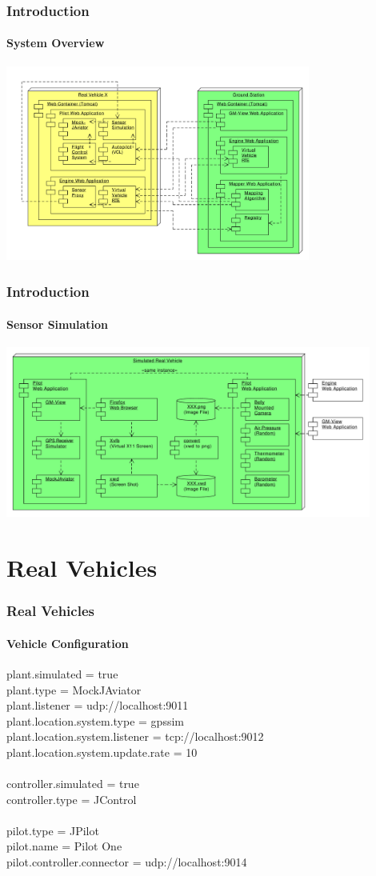 \documentclass{beamer}
\begin{document}
\begin{frame}\frametitle{Introduction}\framesubtitle{System Overview}
	\begin{center}
		{\includegraphics[width=10cm]{SystemOverview.pdf}}
	\end{center}
\end{frame}

\begin{frame}\frametitle{Introduction}\framesubtitle{Sensor Simulation}
	\begin{center}
		{\includegraphics[width=12cm]{SensorSimulation-2.pdf}}
	\end{center}
\end{frame}

\section{Real Vehicles}

\begin{frame}\frametitle{Real Vehicles}\framesubtitle{Vehicle Configuration}
plant.simulated = true \\
plant.type = MockJAviator \\
plant.listener = udp://localhost:9011 \\
plant.location.system.type = gpssim \\
plant.location.system.listener = tcp://localhost:9012 \\
plant.location.system.update.rate = 10 \\
 \\
controller.simulated = true \\
controller.type = JControl \\
 \\
pilot.type = JPilot \\
pilot.name = Pilot One \\
pilot.controller.connector = udp://localhost:9014
\end{frame}
\end{document}
